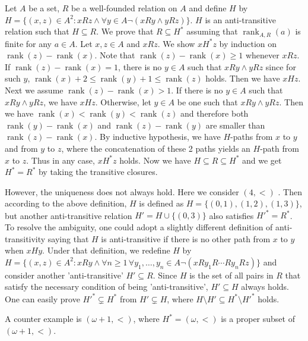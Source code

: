 \documentclass[12pt]{article}
\newcommand{\rank}{\mathop{\mathrm{rank}}}
\theoremstyle{definition}
\newenvironment{customthm}[1]
  {\renewcommand\theinnercustomthm{#1}\innercustomthm}
  {\endinnercustomthm}
\begin{document}
\begin{customthm}{I.9.47}
  Let $A$ be a set, $R$ be a well-founded relation on $A$ and define $H$ by $H=\{(x,z)\in A^2:xRz\wedge\forall y\in A\neg(xRy\wedge yRz)\}$. $H$ is an anti-transitive relation such that $H\subseteq R$. We prove that $R\subseteq H^*$ assuming that $\rank_{A,R}(a)$ is finite for any $a\in A$. Let $x,z\in A$ and $xRz$. We show $xH^*z$ by induction on $\rank(z)-\rank(x)$. Note that $\rank(z)-\rank(x)\geq 1$ whenever $xRz$. If $\rank(z)-\rank(x)=1$, there is no $y\in A$ such that $xRy\wedge yRz$ since for such $y$, $\rank(x)+2\leq\rank(y)+1\leq\rank(z)$ holds. Then we have $xHz$. Next we assume $\rank(z)-\rank(x)>1$. If there is no $y\in A$ such that $xRy\wedge yRz$, we have $xHz$. Otherwise, let $y\in A$ be one such that $xRy\wedge yRz$. Then we have $\rank(x)<\rank(y)<\rank(z)$ and therefore both $\rank(y)-\rank(x)$ and $\rank(z)-\rank(y)$ are smaller than $\rank(z)-\rank(x)$. By inductive hypothesis, we have $H$-paths from $x$ to $y$ and from $y$ to $z$, where the concatenation of these 2 paths yields an $H$-path from $x$ to $z$. Thus in any case, $xH^*z$ holds. Now we have $H\subseteq R\subseteq H^*$ and we get $H^*=R^*$ by taking the transitive closures.

  However, the uniqueness does not always hold. Here we consider $(4,<)$ . Then according to the above definition, $H$ is defined as $H=\{(0,1),(1,2),(1,3)\}$, but another anti-transitive relation $H'=H\cup\{(0,3)\}$ also satisfies $H'^*=R^*$. To resolve the ambiguity, one could adopt a slightly different definition of anti-transitivity saying that $H$ is anti-transitive if there is no other path from $x$ to $y$ when $xHy$. Under that definition, we redefine $H$ by $H=\{(x,z)\in A^2:xRy\wedge\forall n\geq 1\,\forall y_1,\ldots,y_n\in A\neg(xRy_1R\cdots Ry_nRz)\}$ and consider another 'anti-transitive' $H'\subseteq R$. Since $H$ is the set of all pairs in $R$ that satisfy the necessary condition of being 'anti-transitive', $H'\subseteq H$ always holds. One can easily prove $H'^*\subsetneq H^*$ from $H'\subsetneq H$, where $H\setminus H'\subseteq H^*\setminus H'^*$ holds.

  A counter example is $(\omega+1,<)$, where $H^*=(\omega,<)$ is a proper subset of $(\omega+1,<)$.
\end{customthm}
\end{document}
